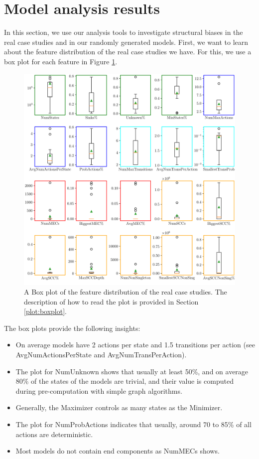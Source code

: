 \section{Model analysis results}
In this section, we use our analysis tools to investigate structural biases in the real case studies and in our randomly generated models.
First, we want to learn about the feature distribution of the real case studies we have. 
For this, we use a box plot for each feature in Figure \ref{fig:Real_FeatureDistribution}.
\begin{figure}[h!]
    \centering
    \includegraphics[width=1\textwidth]{figures/Real_FeatureDistribution.pdf}
    \caption[Feature Distribution of the case studies]{
        A Box plot of the feature distribution of the real case studies.
        The description of how to read the plot is provided in Section \ref{plot:boxplot}.
    }
    \label{fig:Real_FeatureDistribution}
\end{figure}
The box plots provide the following insights:
\begin{itemize} \label{insights:realDistribution}
    \item On average models have 2 actions per state and 1.5 transitions per action (see AvgNumActionsPerState and AvgNumTransPerAction).
    \item The plot for NumUnknown shows that usually at least 50\%, and on average 80\% of the states of the models are trivial, and their value is computed during pre-computation with simple graph algorithms. 
    \item Generally, the Maximizer controls as many states as the Minimizer.
    \item The plot for NumProbActions indicates that usually, around 70 to 85\% of all actions are deterministic.
    \item Most models do not contain end components as NumMECs shows.
\end{itemize}

